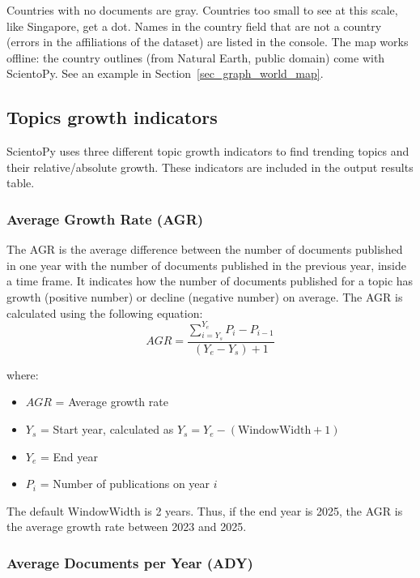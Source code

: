 \documentclass[10pt,letterpaper]{article}
\begin{document}
Countries with no documents are gray. Countries too small to see at this scale, like Singapore, get a dot. Names in the country field that are not a country (errors in the affiliations of the dataset) are listed in the console. The map works offline: the country outlines (from Natural Earth, public domain) come with ScientoPy. See an example in Section~\ref{sec_graph_world_map}.

\subsection{Topics growth indicators}

ScientoPy uses three different topic growth indicators to find trending topics and their relative/absolute growth. These indicators are included in the output results table.

\subsubsection{Average Growth Rate (AGR)}

The AGR is the average difference between the number of documents published in one year with the number of documents published in the previous year, inside a time frame. It indicates how the number of documents published for a topic has growth (positive number) or decline (negative number) on average. The AGR is calculated using the following equation:
\begin{equation}
AGR = \frac{\sum\limits_{i = Y_s}^{Y_e}P_i - P_{i-1}}{(Y_e - Y_s)+1}
\label{equation_AGR}
\end{equation}

where:
\begin{itemize}
\item $AGR$ = Average growth rate
\item $Y_s$ = Start year, calculated as $Y_s = Y_e - (\text{WindowWidth} + 1)$
\item $Y_e$ = End year
\item $P_i$ = Number of publications on year $i$
\end{itemize}

The default WindowWidth is 2 years. Thus, if the end year is 2025, the AGR is the average growth rate between 2023 and 2025.

\subsubsection{Average Documents per Year (ADY)}
\end{document}
